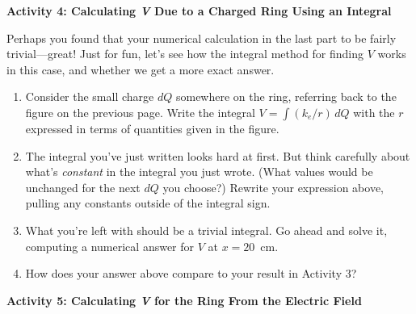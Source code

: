 \pagebreak[2]
\textbf{Activity 4: Calculating \textit{V} Due to a Charged Ring Using an Integral}

Perhaps you found that your numerical calculation in the last part to be fairly trivial---great!  Just for fun, let's see how the integral method for finding $V$ works in this case, and whether we get a more exact answer.

\begin{enumerate}[wide, label=(\emph{\alph*})]

\item Consider the small charge $dQ$ somewhere on the ring, referring back to the figure on the previous page.  Write the integral $V=\int{({k_e/r})\,dQ}$ with the $r$ expressed in terms of quantities given in the figure.
\answerspace{0.7in}

\item The integral you've just written looks hard at first.  But think carefully about what's \textit{constant} in the integral you just wrote.  (What values would be unchanged for the next $dQ$ you choose?)  Rewrite your expression above, pulling any constants outside of the integral sign.
\answerspace{0.5in}

\item What you're left with should be a trivial integral.  Go ahead and solve it, computing a numerical answer for $V$ at $x = 20$~cm.
\answerspace{0.7in}


\item How does your answer above compare to your result in Activity 3?
\answerspace{0.3in}
\end{enumerate}

\textbf{Activity 5: Calculating \textit{V} for the Ring From the Electric Field}

